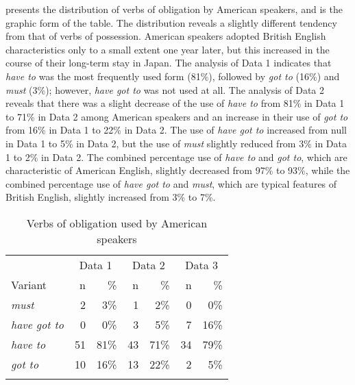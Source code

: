 \documentclass[output=paper,colorlinks,citecolor=brown]{langscibook}
\begin{document}
 presents the distribution of verbs of obligation by American speakers, and  is the graphic form of the table. The distribution reveals a slightly different tendency from that of verbs of possession. American speakers adopted British English characteristics only to a small extent one year later, but this increased in the course of their long-term stay in Japan. The analysis of Data 1 indicates that \textit{have to} was the most frequently used form (81\%), followed by \textit{got to} (16\%) and \textit{must} (3\%); however, \textit{have got to} was not used at all. The analysis of Data 2 reveals that there was a slight decrease of the use of \textit{have to} from 81\% in Data 1 to 71\% in Data 2 among American speakers and an increase in their use of \textit{got to} from 16\% in Data 1 to 22\% in Data 2. The use of \textit{have got to} increased from null in Data 1 to 5\% in Data 2, but the use of \textit{must} slightly reduced from 3\% in Data 1 to 2\% in Data 2. The combined percentage use of \textit{have to} and \textit{got to}, which are characteristic of American English, slightly decreased from 97\% to 93\%, while the combined percentage use of \textit{have got to} and \textit{must}, which are typical features of British English, slightly increased from 3\% to 7\%.

\begin{table}
\begin{tabularx}{.66\textwidth}{X rr rr rr}
\lsptoprule
& \multicolumn{2}{c}{Data 1} & \multicolumn{2}{c}{Data 2} & \multicolumn{2}{c}{Data 3}\\\cmidrule(lr){2-3}\cmidrule(lr){4-5}\cmidrule(lr){6-7}
Variant &  n &  \% &  n &  \% &  n &  \%\\
\midrule
\textit{must} &  2 &  3\% &  1 &  2\% &  0 &  0\%\\
\textit{have got to} &  0 &  0\% &  3 &  5\% &  7 &  16\%\\
\textit{have to} &  51 &  81\% &  43 &  71\% &  34 &  79\%\\
\textit{got to} &  10 & \multicolumn{1}{c}{ 16\%} &  13 &  22\% &  2 &  5\%\\
\lspbottomrule
\end{tabularx}
\caption{Verbs of obligation used by American speakers}
\label{tab:hirano:6}
\end{table}
\end{document}
